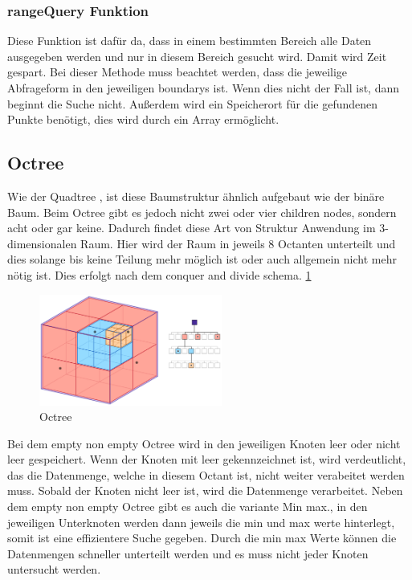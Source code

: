 \documentclass[11pt]{article}
\newcommand{\qt}{Quadtree }
\newcommand{\oc}{Octree }
\newcommand{\fett}[1]{{\bf #1}}
\begin{document}
\subsubsection{rangeQuery Funktion} \label{QuerySuche}
Diese Funktion ist dafür da, dass in einem bestimmten Bereich alle Daten ausgegeben werden und nur in diesem Bereich gesucht wird. Damit wird Zeit gespart. Bei dieser Methode muss beachtet werden, dass die jeweilige Abfrageform in den jeweiligen boundarys ist. 
Wenn dies nicht der Fall ist, dann beginnt die Suche nicht. \newline
Außerdem wird ein Speicherort für die gefundenen Punkte benötigt, dies wird durch ein Array ermöglicht. 

\pagebreak
\subsection{\fett{\oc}}
Wie der \qt , ist diese Baumstruktur ähnlich aufgebaut wie der binäre Baum. Beim \oc gibt es jedoch nicht zwei oder vier children nodes, sondern acht oder gar keine. Dadurch findet diese Art von Struktur Anwendung im 3-dimensionalen Raum. 
Hier wird der Raum in jeweils 8 Octanten unterteilt und dies solange bis keine Teilung mehr möglich ist oder auch allgemein nicht mehr nötig ist. Dies erfolgt nach dem conquer and divide schema.  \ref{Octreeexample}
\begin{figure}[h]
    \begin{center}
    \includegraphics[width=6cm]{octree.png}
    \caption{Octree}
    \label{Octreeexample}
    
\end{center}
\end{figure}
Bei dem empty non empty \oc wird in den jeweiligen Knoten leer oder nicht leer gespeichert. 
Wenn der Knoten mit leer gekennzeichnet ist, wird verdeutlicht, das die Datenmenge, welche in diesem Octant ist, nicht weiter verabeitet werden muss. 
Sobald der Knoten nicht leer ist, wird die Datenmenge verarbeitet. 
Neben dem empty non empty \oc gibt es auch die variante Min max., in den jeweiligen Unterknoten werden dann jeweils die min und max werte hinterlegt, somit ist eine effizientere Suche gegeben. Durch die min max Werte können die Datenmengen schneller unterteilt werden und es muss nicht jeder Knoten untersucht werden. 
\end{document}
